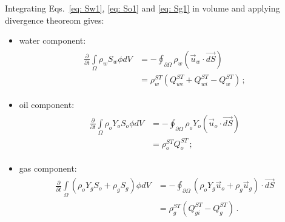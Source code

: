 \documentclass[authoryear,preprint,review,11pt]{elsarticle}
\begin{document}
Integrating Eqs.~\eqref{eq: Sw1}, \eqref{eq: So1} and \eqref{eq: Sg1} in volume and applying divergence theoreom gives:
\begin{itemize}
\item water component:
\begin{align}\label{eq: Sw2}
\begin{split}
\frac{\partial}{\partial t} \int\limits_{\Omega} \rho_w S_w \phi dV &= - \oint_{\partial \Omega} \rho_w \left( \vec{u}_w \cdot \vec{dS} \right) \\
&= \rho_w^{ST}\left(Q_{we}^{ST} + Q_{wi}^{ST}-Q_w^{ST}\right) \, ;
\end{split}
\end{align}

\item oil component:
\begin{align}\label{eq: So2}
\begin{split}
\frac{\partial}{\partial t} \int\limits_{\Omega} \rho_o Y_o S_o \phi dV &= -\oint_{\partial \Omega} \rho_o Y_o \left(\vec{u}_o \cdot \vec{dS} \right) \\
&= \rho_o^{ST}Q_o^{ST} \, ;
\end{split}
\end{align}

\item gas component:
\begin{align}\label{eq: Sg2}
\begin{split}
\frac{\partial}{\partial t} \int\limits_{\Omega} \left( \rho_o Y_g S_o + \rho_g S_g\right) \phi dV &= - \oint_{\partial \Omega} \left( \rho_o Y_g \vec{u}_o + \rho_g \vec{u}_g\right) \cdot \vec{dS} \\
&=  \rho_g^{ST}(Q_{gi}^{ST}-Q_g^{ST}) \, .
\end{split}
\end{align}
\end{itemize}
%
%
%
%
\end{document}
